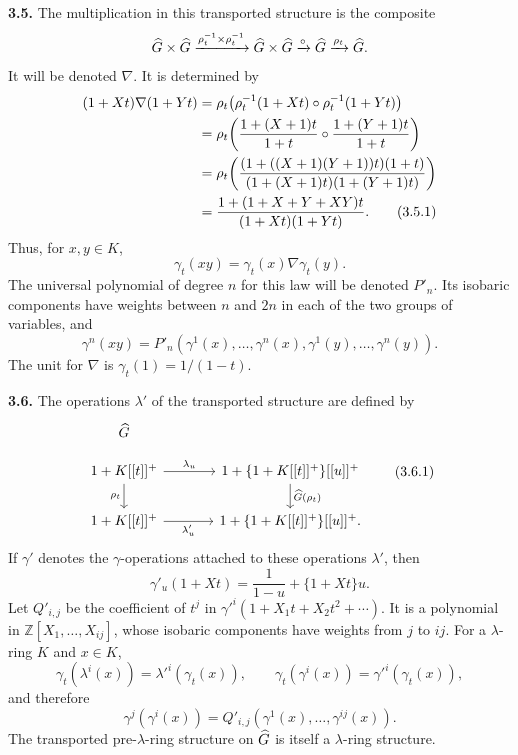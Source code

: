 \documentclass[11pt]{article}
\begin{document}
\textbf{3.5.} The multiplication in this transported structure is the composite
\[
  \widehat G\times\widehat G\xrightarrow{\rho_t^{-1}\times\rho_t^{-1}}
  \widehat G\times\widehat G\xrightarrow{\circ}\widehat G\xrightarrow{\rho_t}\widehat G .
\]
It will be denoted \(\nabla\). It is determined by
\begin{align}
 (1+Xt)\nabla(1+Yt)
 &=\rho_t\!\left(\rho_t^{-1}(1+Xt)\circ\rho_t^{-1}(1+Yt)\right) \notag\\
 &=\rho_t\!\left(\frac{1+(X+1)t}{1+t}\circ
                 \frac{1+(Y+1)t}{1+t}\right) \notag\\
 &=\rho_t\!\left(\frac{(1+((X+1)(Y+1))t)(1+t)}
                      {(1+(X+1)t)(1+(Y+1)t)}\right) \notag\\
 &=\frac{1+(1+X+Y+XY)t}{(1+Xt)(1+Yt)} . \tag{3.5.1}
\end{align}
Thus, for \(x,y\in K\),
\begin{equation}\tag{3.5.2}
  \gamma_t(xy)=\gamma_t(x)\nabla\gamma_t(y).
\end{equation}
The universal polynomial of degree \(n\) for this law will be denoted \(P'_n\). Its isobaric components have weights between \(n\) and \(2n\) in each of the two groups of variables, and
\begin{equation}\tag{3.5.3}
  \gamma^n(xy)
  =P'_n(\gamma^1(x),\ldots,\gamma^n(x),
       \gamma^1(y),\ldots,\gamma^n(y)).
\end{equation}
The unit for \(\nabla\) is \(\gamma_t(1)=1/(1-t)\).

\textbf{3.6.} The operations \(\lambda'\) of the transported structure are defined by
\[
\begin{tikzcd}[column sep=large]
\Ghat \\[-0.6em]
1+K[[t]]^+ \arrow[r,"\lambda_u"] \arrow[d,"\rho_t"'] &
1+\{1+K[[t]]^+\}[[u]]^+ \arrow[d,"\Ghat(\rho_t)"]\\
1+K[[t]]^+ \arrow[r,"\lambda'_u"'] &
1+\{1+K[[t]]^+\}[[u]]^+ .
\end{tikzcd}
\tag{3.6.1}
\]
If \(\gamma'\) denotes the \(\gamma\)-operations attached to these operations \(\lambda'\), then
\begin{equation}\tag{3.6.2}
  \gamma'_u(1+Xt)=\frac1{1-u}+\{1+Xt\}u .
\end{equation}
Let \(Q'_{i,j}\) be the coefficient of \(t^j\) in \(\gamma'^i(1+X_1t+X_2t^2+\cdots)\). It is a polynomial in \(\mathbb Z[X_1,\ldots,X_{ij}]\), whose isobaric components have weights from \(j\) to \(ij\). For a \(\lambda\)-ring \(K\) and \(x\in K\),
\begin{equation}\tag{3.6.3}
  \gamma_t(\lambda^i(x))=\lambda'^i(\gamma_t(x)),
  \qquad
  \gamma_t(\gamma^i(x))=\gamma'^i(\gamma_t(x)),
\end{equation}
and therefore
\begin{equation}\tag{3.6.4}
  \gamma^j(\gamma^i(x))
  =Q'_{i,j}(\gamma^1(x),\ldots,\gamma^{ij}(x)).
\end{equation}
The transported pre-\(\lambda\)-ring structure on \(\widehat G\) is itself a \(\lambda\)-ring structure.
\end{document}
